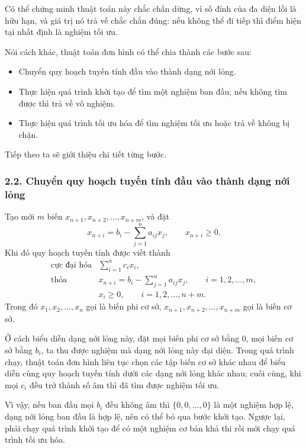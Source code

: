 \documentclass[11pt]{article}
\begin{document}
Có thể chứng minh thuật toán này chắc chắn dừng, vì số đỉnh của đa diện lồi
là hữu hạn, và giá trị nó trả về chắc chắn đúng: nếu không thể đi tiếp thì
điểm hiện tại nhất định là nghiệm tối ưu.

Nói cách khác, thuật toán đơn hình có thể chia thành các bước sau:
\begin{itemize}
  \item Chuyển quy hoạch tuyến tính đầu vào thành dạng nới lỏng.
  \item Thực hiện quá trình khởi tạo để tìm một nghiệm ban đầu; nếu không tìm
  được thì trả về vô nghiệm.
  \item Thực hiện quá trình tối ưu hóa để tìm nghiệm tối ưu hoặc trả về không
  bị chặn.
\end{itemize}
Tiếp theo ta sẽ giới thiệu chi tiết từng bước.

\subsubsection*{2.2. Chuyển quy hoạch tuyến tính đầu vào thành dạng nới lỏng}

Tạo mới \(m\) biến \(x_{n+1},x_{n+2},\ldots,x_{n+m}\), và đặt
\[
  x_{n+i}=b_i-\sum_{j=1}^{n}a_{ij}x_j,\qquad x_{n+i}\ge 0.
\]
Khi đó quy hoạch tuyến tính được viết thành
\[
\begin{array}{ll}
\text{cực đại hóa} & \displaystyle \sum_{i=1}^{n}c_ix_i,\\[0.4em]
\text{thỏa} &
  \displaystyle x_{n+i}=b_i-\sum_{j=1}^{n}a_{ij}x_j,
  \qquad i=1,2,\ldots,m,\\[0.4em]
& x_i\ge 0,\qquad i=1,2,\ldots,n+m.
\end{array}
\]
Trong đó \(x_1,x_2,\ldots,x_n\) gọi là biến phi cơ sở,
\(x_{n+1},x_{n+2},\ldots,x_{n+m}\) gọi là biến cơ sở.

Ở cách biểu diễn dạng nới lỏng này, đặt mọi biến phi cơ sở bằng \(0\), mọi
biến cơ sở bằng \(b_i\), ta thu được nghiệm mà dạng nới lỏng này đại diện.
Trong quá trình chạy, thuật toán đơn hình liên tục chọn các tập biến cơ sở
khác nhau để biểu diễn cùng quy hoạch tuyến tính dưới các dạng nới lỏng khác
nhau; cuối cùng, khi mọi \(c_i\) đều trở thành số âm thì đã tìm được nghiệm
tối ưu.

Vì vậy, nếu ban đầu mọi \(b_i\) đều không âm thì \(\{0,0,\ldots,0\}\) là một
nghiệm hợp lệ, dạng nới lỏng ban đầu là hợp lệ, nên có thể bỏ qua bước khởi
tạo. Ngược lại, phải chạy quá trình khởi tạo để có một nghiệm cơ bản khả thi
rồi mới chạy quá trình tối ưu hóa.
\end{document}

